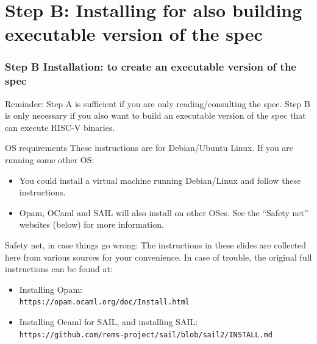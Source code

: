 \documentclass[aspectratio=169]{beamer}
\newcommand{\hm}{\hspace*{1em}}
\newcommand{\scripttt}{\scriptsize\tt}
\begin{document}

\section{Step B: Installing for also building executable version of the spec}

\begin{frame}
  \frametitle{Step B Installation: to create an executable version of the spec}

  {\scriptsize Reminder: Step A is sufficient if you are only
    reading/consulting the spec.  Step B is only necessary if you also
    want to build an executable version of the spec that can execute
    RISC-V binaries.}

  \begin{block}{OS requirements}
    \scriptsize
    These instructions are for Debian/Ubuntu Linux.  If you are running some other OS:
    \begin{itemize}
      \item You could install a virtual machine running Debian/Linux and follow these instructions.


      \item Opam, OCaml and SAIL will also install on other OSes.  See the ``Safety
        net'' websites (below) for more information.

    \end{itemize}
  \end{block}

  \begin{block}{Safety net, in case things go wrong:}
    \scriptsize
    The instructions in these slides are collected here from various
    sources for your convenience. In case of trouble, the original
    full instructions can be found at:

    \begin{itemize}

      \item Installing Opam: \\
        {\scripttt\hm https://opam.ocaml.org/doc/Install.html}

      \item Installing Ocaml for SAIL, and installing SAIL: \\
        {\scripttt\hm https://github.com/rems-project/sail/blob/sail2/INSTALL.md}
    \end{itemize}
  \end{block}

\end{frame}
\end{document}

